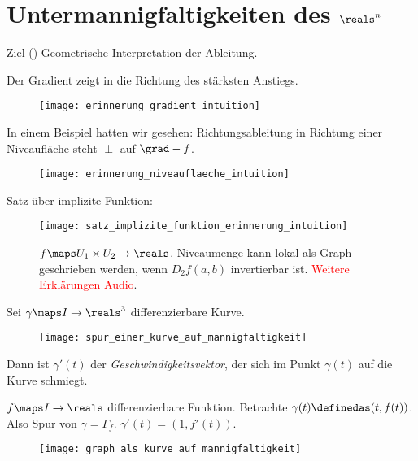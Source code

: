 \chapter{Untermannigfaltigkeiten des \texorpdfstring{\( \reals^n \)}{R\^n}}
Ziel (\ua) Geometrische Interpretation der Ableitung.
\begin{erinnerung*}
  Der Gradient zeigt in die Richtung des stärksten Anstiegs.
  \begin{figure}[H]
    \centering
    \texttt{[image: erinnerung\_gradient\_intuition]}
    \caption*{}
    \label{fig:erinnerung_gradient_intuition}
  \end{figure}
  In einem Beispiel hatten wir gesehen: Richtungsableitung in Richtung einer Niveaufläche steht \( \perp \) auf \( \grad-{f} \).
  \begin{figure}[H]
    \centering
    \texttt{[image: erinnerung\_niveauflaeche\_intuition]}
    \label{fig:erinnerung_niveauflaeche_intuition}
  \end{figure}
  Satz über implizite Funktion: 
  \begin{figure}[H]
    \centering
    \texttt{[image: satz\_implizite\_funktion\_erinnerung\_intuition]}
    \caption*{\( f\maps U_1\times U_2 \to \reals \). Niveaumenge kann lokal als Graph geschrieben werden, wenn \( D_2 f(a,b) \) invertierbar ist. \textcolor{red}{Weitere Erklärungen \tto Audio}.}
    \label{fig:satz_implizite_funktion_erinnerung_intuition}
  \end{figure}
\end{erinnerung*}
\begin{aufwaermuebung*}
  Sei \( \gamma\maps I\to \reals^3 \) differenzierbare Kurve.
  \begin{figure}[H]
    \centering
    \texttt{[image: spur\_einer\_kurve\_auf\_mannigfaltigkeit]}
    \label{fig:spur_einer_kurve_auf_mannigfaltigkeit}
  \end{figure}
  Dann ist \( \gamma'(t) \) der \emph{Geschwindigkeitsvektor}, der sich im Punkt \( \gamma(t) \) auf die Kurve schmiegt.
\end{aufwaermuebung*}
\begin{beispiel*}
  \( f\maps I\to \reals \) differenzierbare Funktion. Betrachte \( \gamma(t)\definedas (t,f(t)) \). Also Spur von \( \gamma=\Gamma_f \). \( \gamma'(t)=(1,f'(t)) \).
  \begin{figure}[H]
    \centering
    \texttt{[image: graph\_als\_kurve\_auf\_mannigfaltigkeit]}
    \label{fig:graph_als_kurve_auf_mannigfaltigkeit}
  \end{figure}
\end{beispiel*}
